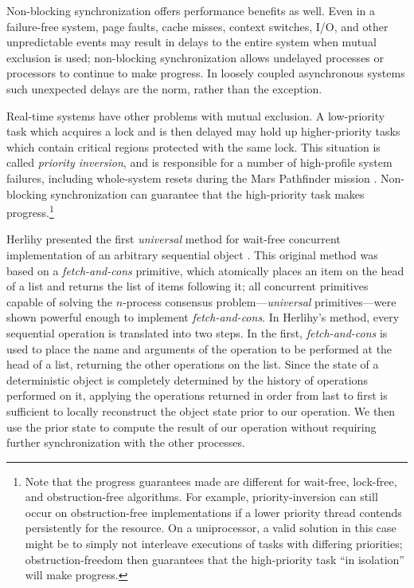 \documentclass[preprint]{rdbacmconf}
\begin{document}
Non-blocking synchronization offers performance benefits as well.
Even in a failure-free system, page faults, cache misses, context
switches, I/O, and other unpredictable events may result in delays to the
entire system when mutual exclusion is used; non-blocking
synchronization allows undelayed processes or processors to continue
to make progress.  In loosely coupled asynchronous systems such
unexpected delays are the norm, rather than the exception.

Real-time systems have other problems with mutual exclusion.
A low-priority task which 
acquires a lock and is then delayed may hold up higher-priority tasks
which contain critical regions protected with the same lock.
This situation is called
\emph{priority inversion}, and is responsible for a number of
high-profile system failures, including whole-system resets during the Mars
Pathfinder mission \cite{Jones97}.  Non-blocking
synchronization can guarantee that the high-priority task makes
progress.\footnote{Note that the progress guarantees made are
  different for wait-free, lock-free, and obstruction-free
  algorithms.  For example, priority-inversion can still occur on
  obstruction-free implementations if a lower priority thread contends
  persistently for the resource.  On a uniprocessor, a valid solution
  in this case might be to simply not interleave executions of tasks
  with differing priorities; obstruction-freedom then guarantees that
  the high-priority task ``in isolation'' will make progress.}

Herlihy presented the first \emph{universal} method for wait-free
concurrent implementation of an arbitrary sequential object
\cite{Herlihy88,Herlihy91}.  This original method was based on
a \emph{fetch-and-cons} primitive, which atomically places
an item on the head of a list and returns the list of items following
it; all concurrent primitives capable of solving the
$n$-process consensus problem---\emph{universal} primitives---were
shown powerful enough to implement \emph{fetch-and-cons}.
In Herlihy's method, 
every sequential operation is translated into two steps.  In the first,
\emph{fetch-and-cons} is used to place the name and arguments of the
operation to be performed
at the head of a list, returning the other operations on the list.
Since the state
of a deterministic object is completely determined by the history of
operations performed on it, applying the operations returned
in order from last to first is sufficient to locally reconstruct the
object state 
prior to our operation.
We then use the prior state to compute the result of our operation
without requiring further synchronization with the other processes.
\end{document}
